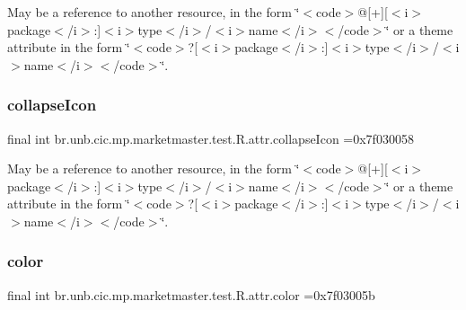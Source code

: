 May be a reference to another resource, in the form \char`\"{}$<$code$>$@\mbox{[}+\mbox{]}\mbox{[}$<$i$>$package$<$/i$>$\+:\mbox{]}$<$i$>$type$<$/i$>$/$<$i$>$name$<$/i$>$$<$/code$>$\char`\"{} or a theme attribute in the form \char`\"{}$<$code$>$?\mbox{[}$<$i$>$package$<$/i$>$\+:\mbox{]}$<$i$>$type$<$/i$>$/$<$i$>$name$<$/i$>$$<$/code$>$\char`\"{}. \mbox{\label{classbr_1_1unb_1_1cic_1_1mp_1_1marketmaster_1_1test_1_1R_1_1attr_a708bc64648379a26262d3a22ae74c2b0}} 
\subsubsection{\texorpdfstring{collapse\+Icon}{collapseIcon}}
{\footnotesize\ttfamily final int br.\+unb.\+cic.\+mp.\+marketmaster.\+test.\+R.\+attr.\+collapse\+Icon =0x7f030058\hspace{0.3cm}{\ttfamily [static]}}

May be a reference to another resource, in the form \char`\"{}$<$code$>$@\mbox{[}+\mbox{]}\mbox{[}$<$i$>$package$<$/i$>$\+:\mbox{]}$<$i$>$type$<$/i$>$/$<$i$>$name$<$/i$>$$<$/code$>$\char`\"{} or a theme attribute in the form \char`\"{}$<$code$>$?\mbox{[}$<$i$>$package$<$/i$>$\+:\mbox{]}$<$i$>$type$<$/i$>$/$<$i$>$name$<$/i$>$$<$/code$>$\char`\"{}. \mbox{\label{classbr_1_1unb_1_1cic_1_1mp_1_1marketmaster_1_1test_1_1R_1_1attr_a977eaff8a0cf7feb2fd684cadcac15dd}} 
\subsubsection{\texorpdfstring{color}{color}}
{\footnotesize\ttfamily final int br.\+unb.\+cic.\+mp.\+marketmaster.\+test.\+R.\+attr.\+color =0x7f03005b\hspace{0.3cm}{\ttfamily [static]}}

